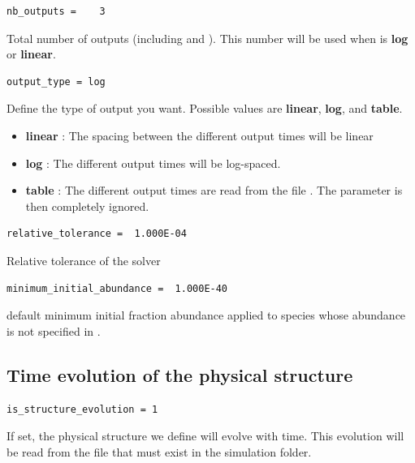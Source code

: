 \documentclass[english,a4paper,twoside]{article}
\begin{document}
\begin{verbatim}
nb_outputs =    3
\end{verbatim}
Total number of outputs (including  and ). This number will be used when  is \textbf{log} or \textbf{linear}.

\begin{verbatim}
output_type = log
\end{verbatim}
Define the type of output you want. Possible values are \textbf{linear}, \textbf{log}, and \textbf{table}. 
\begin{itemize}
\item \textbf{linear} : The spacing between the different output times will be linear
\item \textbf{log} : The different output times will be log-spaced.
\item \textbf{table} : The different output times are read from the file . The parameter  is then completely ignored.
\end{itemize}

\begin{verbatim}
relative_tolerance =  1.000E-04
\end{verbatim}
Relative tolerance of the solver

\begin{verbatim}
minimum_initial_abundance =  1.000E-40
\end{verbatim}
default minimum initial fraction abundance applied to species whose abundance is not specified in .

\subsection{Time evolution of the physical structure}
\begin{verbatim}
is_structure_evolution = 1
\end{verbatim}

If set, the physical structure we define will evolve with time. This evolution will be read from the file  that must exist in the simulation folder. 
\end{document}
